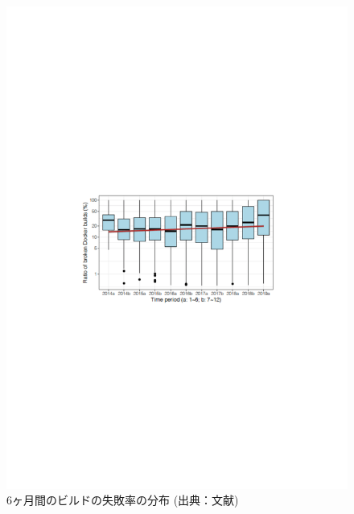 \begin{figure}[t]
    \centering
    \includegraphics[width=0.9\linewidth, angle=0]{./thesis3/docker-build-failuer-ratio-period3.pdf}
    \caption{6ヶ月間のビルドの失敗率の分布 (出典：文献\cite{docker-failures})}
    \label{fig:3_docker-build-failer-ratio-period}
\end{figure}

